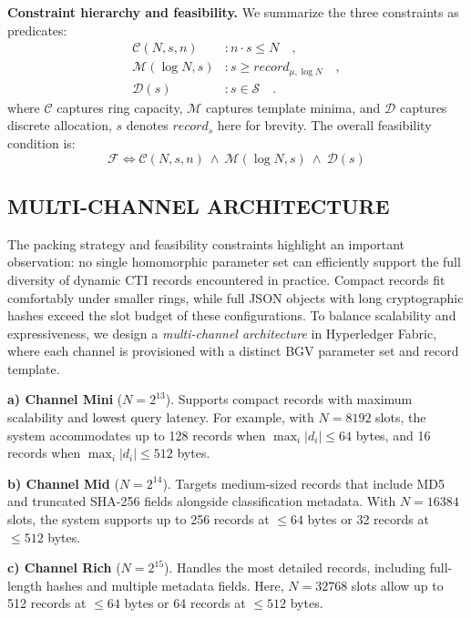 \documentclass{ieeetj}
\begin{document}
\noindent\textbf{Constraint hierarchy and feasibility.}
We summarize the three constraints as predicates:
\begin{subequations}
    \begin{align}
    \mathcal{C}(N,s,n) & : n \cdot s \leq N \quad, \\
    \mathcal{M}(\log N,s) & : s \geq record_{\mu,\log N} \quad, \\
    \mathcal{D}(s) & : s \in \mathcal{S} \quad.
    \end{align}
\end{subequations}
where $\mathcal{C}$ captures ring capacity, $\mathcal{M}$ captures template minima,
and $\mathcal{D}$ captures discrete allocation, $s$ denotes $record_s$ here for brevity. 
The overall feasibility condition is:
\begin{equation}
    \label{eq:feasibility_condition}
    \mathcal{F} \iff
    \mathcal{C}(N,s,n)\ \wedge\ \mathcal{M}(\log N,s)\ \wedge\ \mathcal{D}(s)
\end{equation}

\subsection{MULTI-CHANNEL ARCHITECTURE}

The packing strategy and feasibility constraints highlight an important observation: 
no single homomorphic parameter set can efficiently support the full diversity of dynamic CTI records encountered in practice.
Compact records fit comfortably under smaller rings, while full JSON objects with long cryptographic hashes exceed the 
slot budget of these configurations. To balance scalability and expressiveness, we design a \emph{multi-channel architecture} in 
Hyperledger Fabric, where each channel is provisioned with a distinct BGV parameter set and record template.

\textbf{a) Channel Mini} ($N=2^{13}$).  
Supports compact records with maximum scalability and lowest query latency. 
For example, with $N=8192$ slots, the system accommodates up to 128 records when $\max_i |d_i| \leq 64$ bytes, 
and 16 records when $\max_i |d_i| \leq 512$ bytes.

\textbf{b) Channel Mid} ($N=2^{14}$).
Targets medium-sized records that include MD5 and truncated SHA-256 fields alongside classification metadata. 
With $N=16384$ slots, the system supports up to 256 records at $\leq 64$ bytes or 32 records at $\leq 512$ bytes.

\textbf{c) Channel Rich} ($N=2^{15}$).
Handles the most detailed records, including full-length hashes and multiple metadata fields. 
Here, $N=32768$ slots allow up to 512 records at $\leq 64$ bytes or 64 records at $\leq 512$ bytes.
\end{document}
